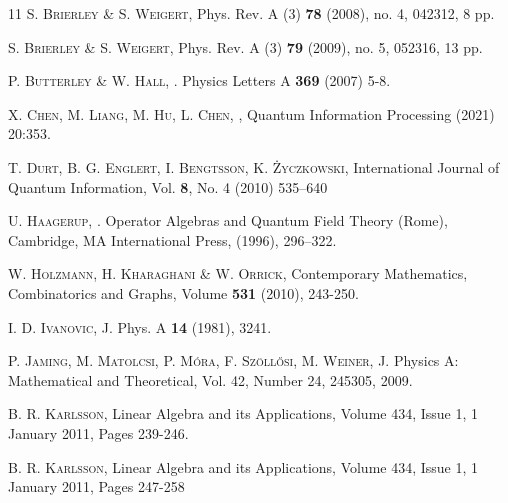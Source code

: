 \documentclass[12pt]{amsart}
\numberwithin{equation}{section}
\theoremstyle{definition}
\theoremstyle{remark}
\theoremstyle{remark}
\begin{document}
\begin{thebibliography}{11}
\textsc{S. Brierley \& S. Weigert},
Phys. Rev. A (3)  {\bf 78}  (2008),  no. 4, 042312, 8 pp.

\textsc{S. Brierley \& S. Weigert},
Phys. Rev. A (3)  {\bf 79}  (2009),  no. 5, 052316, 13 pp.

\textsc{P. Butterley \& W. Hall},
. Physics Letters A {\bf 369} (2007) 5-8.


\textsc{X. Chen, M. Liang,  M. Hu, L. Chen}, 
, 
Quantum Information Processing (2021) 20:353.


\textsc{T. Durt, B. G. Englert, I. Bengtsson,  K. \.Zyczkowski},
International Journal of Quantum Information,
Vol. {\bf 8}, No. 4 (2010) 535--640

\textsc{U. Haagerup},
.
Operator Algebras and Quantum Field Theory (Rome), Cambridge, MA
International Press, (1996), 296--322.


\textsc{W. Holzmann, H. Kharaghani \& W. Orrick},
Contemporary Mathematics, Combinatorics and Graphs, Volume {\bf 531} (2010), 243-250.


\textsc{I. D. Ivanovic},
J. Phys. A {\bf 14} (1981), 3241.

\textsc{P. Jaming, M. Matolcsi, P. M\'ora, F. Sz\"oll\H{o}si, M.
Weiner},
J. Physics A: Mathematical and Theoretical, Vol. 42, Number
24, 245305, 2009.

\textsc{B. R. Karlsson},
Linear Algebra and its Applications, Volume 434, Issue 1, 1 January 2011, Pages 239-246.

\textsc{B. R. Karlsson},
Linear Algebra and its Applications,
Volume 434, Issue 1, 1 January 2011, Pages 247-258


\end{thebibliography}
\end{document}
